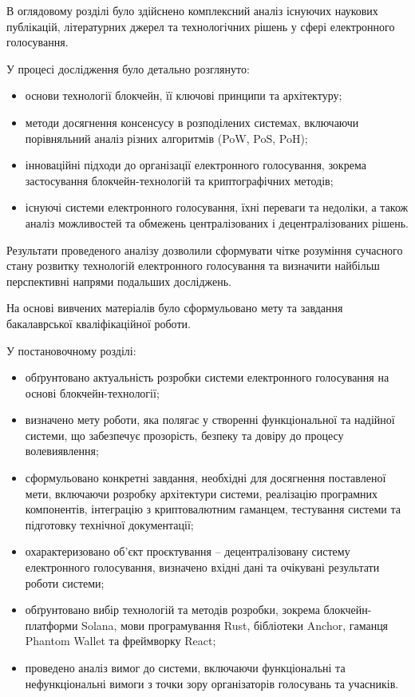 \documentclass[14pt]{extreport}
\begin{document}
 В оглядовому розділі було здійснено комплексний аналіз існуючих наукових публікацій, літературних джерел та технологічних рішень у сфері електронного голосування.

У процесі дослідження було детально розглянуто:

\begin{itemize}
  \item основи технології блокчейн, її ключові принципи та архітектуру;
\item методи досягнення консенсусу в розподілених системах, включаючи порівняльний аналіз різних алгоритмів (PoW, PoS, PoH);
\item інноваційні підходи до організації електронного голосування, зокрема застосування блокчейн-технологій та криптографічних методів;
\item існуючі системи електронного голосування, їхні переваги та недоліки, а також аналіз можливостей та обмежень централізованих і децентралізованих рішень.
\end{itemize}

Результати проведеного аналізу дозволили сформувати чітке розуміння сучасного стану розвитку технологій електронного голосування та визначити найбільш перспективні напрями подальших досліджень.

 На основі вивчених матеріалів було сформульовано мету та завдання бакалаврської кваліфікаційної роботи.

У постановочному розділі:

\begin{itemize}
 \item обґрунтовано актуальність розробки системи електронного голосування на основі блокчейн-технології;
\item визначено мету роботи, яка полягає у створенні функціональної та надійної системи, що забезпечує прозорість, безпеку та довіру до процесу волевиявлення;
\item сформульовано конкретні завдання, необхідні для досягнення поставленої мети, включаючи розробку архітектури системи, реалізацію програмних компонентів, інтеграцію з криптовалютним гаманцем, тестування системи та підготовку технічної документації;
\item охарактеризовано об'єкт проєктування – децентралізовану систему електронного голосування, визначено вхідні дані та очікувані результати роботи системи;
\item обґрунтовано вибір технологій та методів розробки, зокрема блокчейн-платформи Solana, мови програмування Rust, бібліотеки Anchor, гаманця Phantom Wallet та фреймворку React;
\item проведено аналіз вимог до системи, включаючи функціональні та нефункціональні вимоги з точки зору організаторів голосувань та учасників.
\end{itemize}
\end{document}
